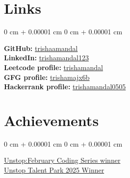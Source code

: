\documentclass[12pt, a3paper]{article}
\newenvironment{highlightsforbulletentries}{
    \begin{itemize}[
        topsep=0.10 cm,
        parsep=0.10 cm,
        partopsep=0pt,
        itemsep=0pt,
        leftmargin=10pt
    ]
}{
    \end{itemize}
} %
\newenvironment{onecolentry}{
    \begin{adjustwidth}{
        0 cm + 0.00001 cm
    }{
        0 cm + 0.00001 cm
    }
}{
    \end{adjustwidth}
} %
\begin{document}
        \section{Links}

        \begin{onecolentry}
            \begin{highlightsforbulletentries}
    
    
                \textbf{GitHub:} \href{https://github.com/trishaamandal}{trishaamandal} \\
                \textbf{LinkedIn:} \href{https://www.linkedin.com/in/trishamandal123/}{trishamandal123} \\                   
                \textbf{Leetcode profile:} \href{https://leetcode.com/u/trishumandal/}{trishamandal} \\
                \textbf{GFG profile:} \href{https://www.geeksforgeeks.org/user/trishamajx6b/}{trishamajx6b} \\
                \textbf{Hackerrank profile:} \href{https://www.hackerrank.com/profile/trishamandal0505}{trishamandal0505}
            \end{highlightsforbulletentries}
        \end{onecolentry}
        \vspace{0.7 cm}
        \section{Achievements}

        \begin{onecolentry}
            \begin{highlightsforbulletentries}
                \href{https://unstop.com/certificate-preview/a2c45722-20b1-4708-81ba-74b1874823f1}{Unstop:February Coding Series winner} \\
                 \href{https://unstop.com/certificate-preview/a2c45722-20b1-4708-81ba-74b1874823f1}{ Unstop Talent Park 2025 Winner}
           
    
            \end{highlightsforbulletentries}
        \end{onecolentry}

    
\end{document}
